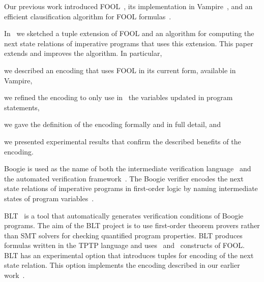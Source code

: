 Our previous work introduced FOOL~\cite{FOOL}, its implementation in Vampire~\cite{VampireAndFOOL}, and an efficient clausification algorithm for FOOL formulas~\cite{FOOLCNF}.

In~\cite{VampireAndFOOL} we sketched a tuple extension of FOOL and an algorithm for computing the next state relations of imperative programs that uses this extension. This paper extends and improves the algorithm. In particular, \begin{enumerate*}[label=(\roman*)]\item we described an encoding that uses FOOL in its current form, available in Vampire, \item we refined the encoding to only use in \LETIN\ the variables updated in program statements, \item we gave the definition of the encoding formally and in full detail, and \item we presented experimental results that confirm the described benefits of the encoding.\end{enumerate*}

Boogie is used as the name of both the intermediate verification language~\cite{leino2008boogie} and the automated verification framework~\cite{DBLP:conf/fmco/BarnettCDJL05}. The Boogie verifier encodes the next state relations of imperative programs in first-order logic by naming intermediate states of program variables~\cite{DBLP:journals/ipl/Leino05}.

BLT~\cite{CF-iFM17} is a tool that automatically generates verification conditions of Boogie programs. The aim of the BLT project is to use first-order theorem provers rather than SMT solvers for checking quantified program properties. BLT produces formulas written in the TPTP language and uses \ITE\ and \LETIN\ constructs of FOOL. BLT has an experimental option that introduces tuples for encoding of the next state relation. This option implements the encoding described in our earlier work~\cite{VampireAndFOOL}.